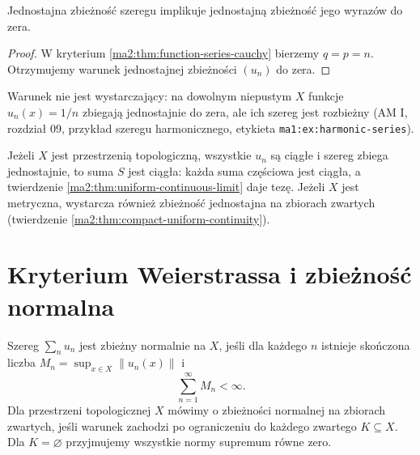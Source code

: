 \begin{wniosek}
\label{ma2:cor:uniform-series-term}
Jednostajna zbieżność szeregu implikuje
jednostajną zbieżność jego wyrazów do zera.
\end{wniosek}
\begin{proof}
W kryterium \ref{ma2:thm:function-series-cauchy}
bierzemy $q=p=n$. Otrzymujemy warunek
jednostajnej zbieżności $(u_n)$ do zera.
\end{proof}
Warunek nie jest wystarczający: na dowolnym
niepustym $X$ funkcje $u_n(x)=1/n$ zbiegają
jednostajnie do zera, ale ich szereg jest
rozbieżny (AM I, rozdział 09, przykład szeregu
harmonicznego, etykieta \texttt{ma1:ex:harmonic-series}).

Jeżeli $X$ jest przestrzenią topologiczną,
wszystkie $u_n$ są ciągłe i szereg zbiega
jednostajnie, to suma $S$ jest ciągła:
każda suma częściowa jest ciągła, a twierdzenie
\ref{ma2:thm:uniform-continuous-limit} daje tezę.
Jeżeli $X$ jest metryczna, wystarcza również
zbieżność jednostajna na zbiorach zwartych
(twierdzenie \ref{ma2:thm:compact-uniform-continuity}).

\section{Kryterium Weierstrassa i zbieżność normalna}

\begin{definicja}
\label{ma2:def:normal-series}
Szereg $\sum_n u_n$ jest zbieżny normalnie na $X$,
jeśli dla każdego $n$ istnieje skończona liczba
$M_n=\sup_{x\in X}\|u_n(x)\|$ i
\[
 \sum_{n=1}^{\infty}M_n<\infty.
\]
Dla przestrzeni topologicznej $X$ mówimy o zbieżności
normalnej na zbiorach zwartych, jeśli warunek
zachodzi po ograniczeniu do każdego zwartego
$K\subseteq X$. Dla $K=\varnothing$ przyjmujemy
wszystkie normy supremum równe zero.
\end{definicja}

